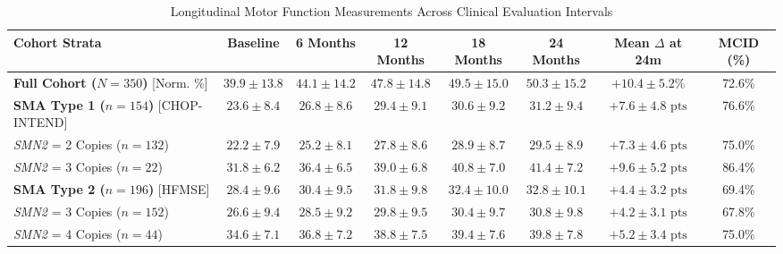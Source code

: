 \documentclass[journal]{IEEEtran}
\begin{document}
\clearpage

\begin{table}[!t]
\caption{Longitudinal Motor Function Measurements Across Clinical Evaluation Intervals}
\label{tab:longitudinal}
\centering
\begin{tabular}{lccccccc}
\toprule
\textbf{Cohort Strata} & \textbf{Baseline} & \textbf{6 Months} & \textbf{12 Months} & \textbf{18 Months} & \textbf{24 Months} & \textbf{Mean $\Delta$ at 24m} & \textbf{MCID (\%)} \\
\midrule
\textbf{Full Cohort ($N=350$)} [Norm. \%] & $39.9 \pm 13.8$ & $44.1 \pm 14.2$ & $47.8 \pm 14.8$ & $49.5 \pm 15.0$ & $50.3 \pm 15.2$ & $+10.4 \pm 5.2\%$ & 72.6\% \\
\textbf{SMA Type 1 ($n=154$)} [CHOP-INTEND] & $23.6 \pm 8.4$ & $26.8 \pm 8.6$ & $29.4 \pm 9.1$ & $30.6 \pm 9.2$ & $31.2 \pm 9.4$ & $+7.6 \pm 4.8\text{ pts}$ & 76.6\% \\
\quad \textit{SMN2} = 2 Copies ($n=132$) & $22.2 \pm 7.9$ & $25.2 \pm 8.1$ & $27.8 \pm 8.6$ & $28.9 \pm 8.7$ & $29.5 \pm 8.9$ & $+7.3 \pm 4.6\text{ pts}$ & 75.0\% \\
\quad \textit{SMN2} = 3 Copies ($n=22$) & $31.8 \pm 6.2$ & $36.4 \pm 6.5$ & $39.0 \pm 6.8$ & $40.8 \pm 7.0$ & $41.4 \pm 7.2$ & $+9.6 \pm 5.2\text{ pts}$ & 86.4\% \\
\textbf{SMA Type 2 ($n=196$)} [HFMSE] & $28.4 \pm 9.6$ & $30.4 \pm 9.5$ & $31.8 \pm 9.8$ & $32.4 \pm 10.0$ & $32.8 \pm 10.1$ & $+4.4 \pm 3.2\text{ pts}$ & 69.4\% \\
\quad \textit{SMN2} = 3 Copies ($n=152$) & $26.6 \pm 9.4$ & $28.5 \pm 9.2$ & $29.8 \pm 9.5$ & $30.4 \pm 9.7$ & $30.8 \pm 9.8$ & $+4.2 \pm 3.1\text{ pts}$ & 67.8\% \\
\quad \textit{SMN2} = 4 Copies ($n=44$) & $34.6 \pm 7.1$ & $36.8 \pm 7.2$ & $38.8 \pm 7.5$ & $39.4 \pm 7.6$ & $39.8 \pm 7.8$ & $+5.2 \pm 3.4\text{ pts}$ & 75.0\% \\
\bottomrule
\end{tabular}
\end{table}
\end{document}
